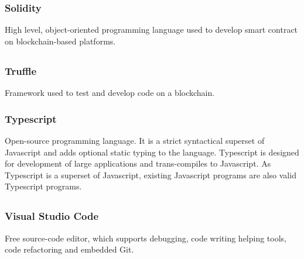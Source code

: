 		\subsubsection*{Solidity}
			High level, object-oriented programming language used to develop smart contract on blockchain-based platforms.
		
	\subsection*{}
		\subsubsection*{Truffle}
			Framework used to test and develop code on a blockchain.
		\subsubsection*{Typescript}
			Open-source programming language. It is a strict syntactical superset of Javascript and adds optional static typing to the language. Typescript is designed for development of large applications and trans-compiles to Javascript. As Typescript is a superset of Javascript, existing Javascript programs are also valid Typescript programs.
			
	\subsection*{}
		\subsubsection*{Visual Studio Code}
			Free source-code editor, which supports debugging, code writing helping tools, code refactoring and embedded Git.
	